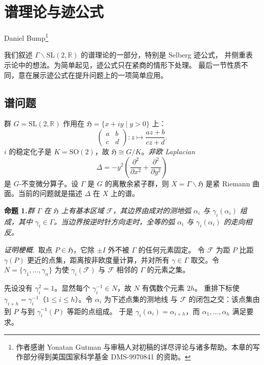 \chapter{谱理论与迹公式}\label{ch:08}

\begin{center}
Daniel Bump\footnote{作者感谢 Yonatan Gutman 与审稿人对初稿的详尽评论与诸多帮助。本章的写作部分得到美国国家科学基金 DMS-9970841 的资助。}
\end{center}

我们叙述 $\Gamma\backslash\mathrm{SL}(2,\mathbb{R})$ 的谱理论的一部分，特别是 Selberg 迹公式，
并侧重表示论中的想法。为简单起见，迹公式只在紧商的情形下处理。
最后一节性质不同，意在展示迹公式在提升问题上的一项简单应用。

\section{谱问题}

群 $G=\mathrm{SL}(2,\mathbb{R})$ 作用在 $\mathfrak{H}=\{x+iy\mid y>0\}$ 上：
\[
\begin{pmatrix}a&b\\c&d\end{pmatrix}:z\longmapsto\frac{az+b}{cz+d}.
\]
$i$ 的稳定化子是 $K=\mathrm{SO}(2)$，故 $\mathfrak{H}\cong G/K$。\emph{非欧 Laplacian}
\begin{equation}\tag{1}
\Delta=-y^{2}\left(\frac{\partial^{2}}{\partial x^{2}}+\frac{\partial^{2}}{\partial y^{2}}\right)
\end{equation}
是 $G$-不变微分算子。设 $\Gamma$ 是 $G$ 的离散余紧子群，则 $X=\Gamma\backslash\mathfrak{H}$
是紧 Riemann 曲面。当前的问题就是描述 $\Delta$ 在 $X$ 上的谱。

\par\medskip\noindent\textbf{命题 1.}\quad\emph{群 $\Gamma$ 在 $\mathfrak{H}$ 上有基本区域
$\mathcal{F}$，其边界由成对的测地弧 $\alpha_{i}$ 与 $\gamma_{i}(\alpha_{i})$ 组成，其中
$\gamma_{i}\in\Gamma$。当边界按逆时针方向走时，全等的弧 $\alpha_{i}$ 与 $\gamma_{i}(\alpha_{i})$
的走向相反。}

\smallskip
\noindent\emph{证明梗概.}\ 取点 $P\in\mathfrak{H}$，它除 $\pm I$ 外不被 $\Gamma$ 的任何元素固定。
令 $\mathcal{F}$ 为距 $P$ 比距 $\gamma(P)$ 更近的点集，距离按非欧度量计算，并对所有
$\gamma\in\Gamma$ 取交。令 $N=\{\gamma_{1},\dots,\gamma_{n}\}$ 为使 $\gamma_{i}(\mathcal{F})$
与 $\mathcal{F}$ 相邻的 $\Gamma$ 的元素之集。

先设没有 $\gamma_{i}^{2}=1$。显然每个 $\gamma_{i}^{-1}\in N$，故 $N$ 有偶数个元素 $2h$。
重排下标使 $\gamma_{i+h}=\gamma_{i}^{-1}$（$1\le i\le h$）。令 $\alpha_{i}$ 为下述点集的测地线
与 $\mathcal{F}$ 的闭包之交：该点集由到 $P$ 与到 $\gamma_{i}^{-1}(P)$ 等距的点组成。
于是 $\gamma_{i}(\alpha_{i})=\alpha_{i+h}$，而 $\alpha_{1},\dots,\alpha_{h}$ 满足要求。

